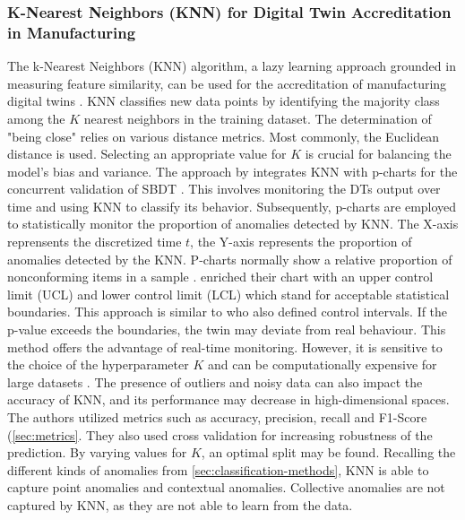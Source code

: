 \subsubsection*{K-Nearest Neighbors (KNN) for Digital Twin Accreditation in Manufacturing}
The k-Nearest Neighbors (KNN) algorithm, a lazy learning approach grounded in measuring feature similarity, can be used for the accreditation of manufacturing digital twins \autocite{dos2024simulation}. KNN classifies new data points by identifying the majority class among the $K$ nearest neighbors in the training dataset. The determination of "being close" relies on various distance metrics. Most commonly, the Euclidean distance is used. Selecting an appropriate value for $K$ is crucial for balancing the model's bias and variance.
The approach by \autocite{dos2024simulation} integrates KNN with p-charts for the concurrent validation of SBDT \autocite{dos2024digital}. This involves monitoring the DTs output over time and using KNN to classify its behavior. Subsequently, p-charts are employed to statistically monitor the proportion of anomalies detected by KNN. The X-axis reprensents the discretized time $t$, the Y-axis represents the proportion of anomalies detected by the KNN. P-charts normally show a relative proportion of nonconforming items in a sample \autocite{acosta1999improved}. \Autocite{dos2024simulation} enriched their chart with an upper control limit (UCL) and lower control limit (LCL) which stand for acceptable statistical boundaries. This approach is similar to \autocite{Nie2023rcim} who also defined control intervals. If the p-value exceeds the boundaries, the twin may deviate from real behaviour. This method offers the advantage of real-time monitoring. However, it is sensitive to the choice of the hyperparameter $K$ and can be computationally expensive for large datasets \autocite{dos2024simulation}. The presence of outliers and noisy data can also impact the accuracy of KNN, and its performance may decrease in high-dimensional spaces. The authors utilized metrics such as accuracy, precision, recall and F1-Score (\autoref{sec:metrics}. They also used cross validation for increasing robustness of the prediction. By varying values for $K$, an optimal split may be found. Recalling the different kinds of anomalies from \autoref{sec:classification-methods}, KNN is able to capture point anomalies and contextual anomalies. Collective anomalies are not captured by KNN, as they are not able to learn from the data.
